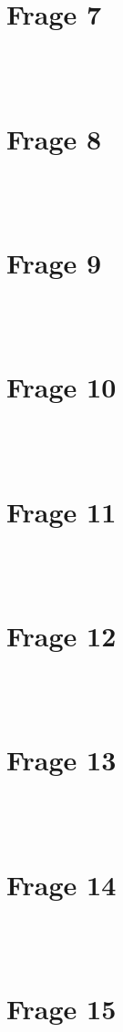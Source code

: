\documentclass[a4paper]{scrartcl}
\begin{document}
~\\
~\\
\section*{Frage 7}

~\\
~\\
\section*{Frage 8}

~\\
~\\
\section*{Frage 9}

~\\
~\\
\section*{Frage 10}

~\\
~\\
\section*{Frage 11}

~\\
~\\
\section*{Frage 12}

~\\
~\\
\section*{Frage 13}

~\\
~\\
\section*{Frage 14}

~\\
~\\
\section*{Frage 15}
\end{document}
